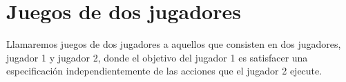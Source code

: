 \section{Juegos de dos jugadores}

Llamaremos juegos de dos jugadores a aquellos que consisten en dos jugadores, jugador 1 y jugador 2, donde el objetivo
del jugador 1 es satisfacer una especificación independientemente de las acciones que el jugador 2 ejecute. 

